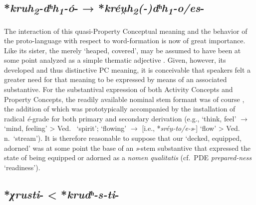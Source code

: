 \documentclass[output=paper,colorlinks,citecolor=brown]{langscibook}
\begin{document}
\subsection{*\textit{kruh\textsubscript{2}-dʰh\textsubscript{1}-ó}- → *\textit{kréu̯h\textsubscript{2}(-)dʰh\textsubscript{1}-o/es}-}

The interaction of this quasi-Property Conceptual meaning and the behavior of the proto-language with respect to word-formation is now of great importance. Like its sister, the merely   ‘heaped, covered’,  may be assumed to have been at some point analyzed as a simple thematic adjective . Given, however, its developed and thus distinctive PC meaning, it is conceivable that speakers felt a greater need for that meaning to be expressed by means of an associated substantive. For the substantival expression of both Activity  Concepts and Property Concepts, the readily available nominal stem formant was of course , the addition of which was prototypically accompanied by the installation of radical \textit{é}-grade for both primary  and secondary derivation (e.g.,  ‘think, feel’ $\rightarrow$  ‘mind, feeling’ > Ved.\  ‘spirit’;  ‘flowing’ $\rightarrow$  [i.e., *\textit{sréu̯-to/e-s}-] ‘flow’ > Ved.\  n.\ ‘stream’). It is therefore reasonable to suppose that our  ‘decked, equipped, adorned’ was at some point the base of an \textit{s}-stem substantive \mbox{} that expressed the  state of being equipped or adorned as a \textit{nomen qualitatis} (cf.\ PDE \textit{prepared-ness} ‘readiness’).

\subsection{*\textit{χrusti}- < *\textit{krudʰ-s-ti}-}
\end{document}
